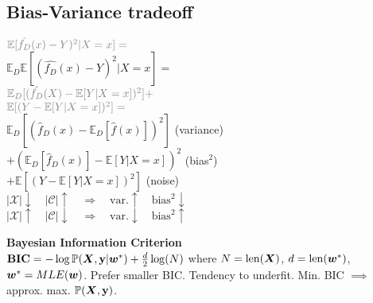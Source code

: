 \subsection*{Bias-Variance tradeoff}
$\color{gray}\mathbb{E}[\hat{f_D}(x)-Y)^2|X=x]=$\\
$\mathbb{E}_D\mathbb{E}[(\hat{f_D}(x)-Y)^2|X=x]=$\\
$\color{gray}\mathbb{E}_D[(\hat{f_D}(X)-\mathbb{E}[Y|X=x])^2]+$\\$\color{gray}\mathbb{E}[(Y-\mathbb{E}[Y|X=x])^2]=$\\
$\mathbb{E}_D[(\hat{f}_D(x)-\mathbb{E}_D[\hat{f}(x)])^2]$ (variance)\\
$+(\mathbb{E}_D[\hat{f}_D(x)]-\mathbb{E}[Y|X=x])^2$ (bias$^2$)\\
$+\mathbb{E}[(Y-\mathbb{E}[Y|X=x])^2]$ (noise)\\

$|\mathcal{X}|\downarrow \quad|\mathcal{C}|\uparrow\quad\Rightarrow\quad\mathrm{var.}\uparrow\quad\mathrm{bias^2}\downarrow $\\
$|\mathcal{X}|\uparrow \quad|\mathcal{C}|\downarrow\quad\Rightarrow\quad\mathrm{var.}\downarrow\quad\mathrm{bias^2}\uparrow $

\textbf{Bayesian Information Criterion}\\
$\mathbf{BIC}=-\log\mathbb{P}({\bm{X}}, {\mathbf{y}}|{\bm{w}}^*)+\frac{d}{2}\log(N)$ where $N=\mathrm{len}({\bm{X}})$, $d=\mathrm{len}({\bm{w}}^*)$, ${\bm{w}}^*=MLE({\bm{w}})$. Prefer smaller BIC. Tendency to underfit. Min. BIC $\implies$ approx. max. $\mathbb{P}({\bm{X}}, {\mathbf{y}})$.\\